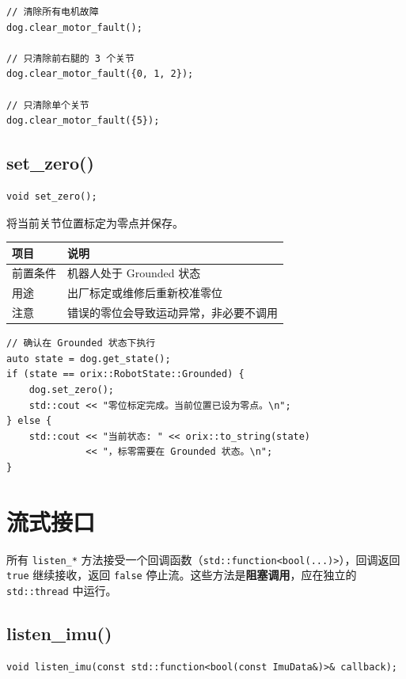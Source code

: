 \documentclass[a4paper,11pt,openany]{book}
\begin{document}
\begin{lstlisting}[style=cpp]
// 清除所有电机故障
dog.clear_motor_fault();

// 只清除前右腿的 3 个关节
dog.clear_motor_fault({0, 1, 2});

// 只清除单个关节
dog.clear_motor_fault({5});
\end{lstlisting}

\subsection{set\_zero()}

\begin{lstlisting}[style=cpp,numbers=none]
void set_zero();
\end{lstlisting}

将当前关节位置标定为零点并保存。

\begin{longtable}{ll}
\toprule
项目 & 说明 \\
\midrule
\endhead
前置条件 & 机器人处于 Grounded 状态 \\
用途 & 出厂标定或维修后重新校准零位 \\
注意 & 错误的零位会导致运动异常，非必要不调用 \\
\bottomrule
\end{longtable}

\begin{lstlisting}[style=cpp]
// 确认在 Grounded 状态下执行
auto state = dog.get_state();
if (state == orix::RobotState::Grounded) {
    dog.set_zero();
    std::cout << "零位标定完成。当前位置已设为零点。\n";
} else {
    std::cout << "当前状态: " << orix::to_string(state)
              << "，标零需要在 Grounded 状态。\n";
}
\end{lstlisting}

\section{流式接口}

所有 \texttt{listen\_*} 方法接受一个回调函数（\texttt{std::function<bool(...)>}），回调返回 \texttt{true} 继续接收，返回 \texttt{false} 停止流。这些方法是\textbf{阻塞调用}，应在独立的 \texttt{std::thread} 中运行。

\subsection{listen\_imu()}

\begin{lstlisting}[style=cpp,numbers=none]
void listen_imu(const std::function<bool(const ImuData&)>& callback);
\end{lstlisting}
\end{document}
